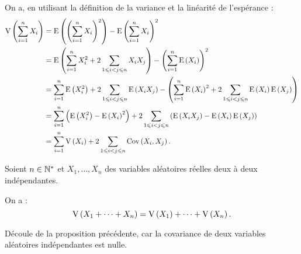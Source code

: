 \begin{dem}
On a, en utilisant la définition de la variance et la linéarité de l'espérance : \[\begin{aligned}
\vari{\sum_{i=1}^nX_i}&=\esp{\paren{\sum_{i=1}^nX_i}^2}-\esp{\sum_{i=1}^nX_i}^2 \\
&=\esp{\sum_{i=1}^nX_i^2+2\sum_{1\leq i<j\leq n}X_iX_j}-\paren{\sum_{i=1}^n\esp{X_i}}^2 \\
&=\sum_{i=1}^n\esp{X_i^2}+2\sum_{1\leq i<j\leq n}\esp{X_iX_j}-\paren{\sum_{i=1}^n\esp{X_i}^2+2\sum_{1\leq i<j\leq n}\esp{X_i}\esp{X_j}} \\
&=\sum_{i=1}^n\paren{\esp{X_i^2}-\esp{X_i}^2}+2\sum_{1\leq i<j\leq n}\paren{\esp{X_iX_j}-\esp{X_i}\esp{X_j}} \\
&=\sum_{i=1}^n\vari{X_i}+2\sum_{1\leq i<j\leq n}\cov{X_i}{X_j}.
\end{aligned}\]
\end{dem}

\begin{cor}
Soient \(n\in\Ns\) et \(X_1,\dots,X_n\) des variables aléatoires réelles deux à deux indépendantes.

On a : \[\vari{X_1+\dots+X_n}=\vari{X_1}+\dots+\vari{X_n}.\]
\end{cor}

\begin{dem}
Découle de la proposition précédente, car la covariance de deux variables aléatoires indépendantes est nulle.
\end{dem}